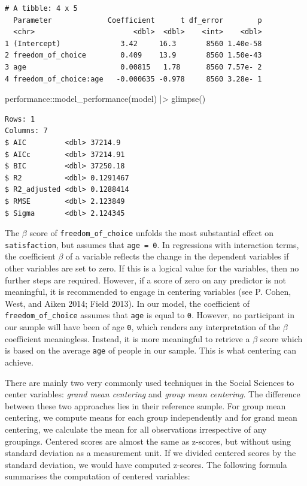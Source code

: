 \documentclass[
  letterpaper,
  DIV=11,
  numbers=noendperiod]{scrreprt}
\newenvironment{Shaded}{\begin{snugshade}}{\end{snugshade}}
\newcommand{\FunctionTok}[1]{\textcolor[rgb]{0.28,0.35,0.67}{#1}}
\newcommand{\NormalTok}[1]{\textcolor[rgb]{0.00,0.23,0.31}{#1}}
\newcommand{\SpecialCharTok}[1]{\textcolor[rgb]{0.37,0.37,0.37}{#1}}
\begin{document}
\begin{verbatim}
# A tibble: 4 x 5
  Parameter             Coefficient      t df_error        p
  <chr>                       <dbl>  <dbl>    <int>    <dbl>
1 (Intercept)              3.42     16.3       8560 1.40e-58
2 freedom_of_choice        0.409    13.9       8560 1.50e-43
3 age                      0.00815   1.78      8560 7.57e- 2
4 freedom_of_choice:age   -0.000635 -0.978     8560 3.28e- 1
\end{verbatim}

\begin{Shaded}
\begin{Highlighting}[]
\NormalTok{performance}\SpecialCharTok{::}\FunctionTok{model\_performance}\NormalTok{(model) }\SpecialCharTok{|\textgreater{}}
  \FunctionTok{glimpse}\NormalTok{()}
\end{Highlighting}
\end{Shaded}

\begin{verbatim}
Rows: 1
Columns: 7
$ AIC         <dbl> 37214.9
$ AICc        <dbl> 37214.91
$ BIC         <dbl> 37250.18
$ R2          <dbl> 0.1291467
$ R2_adjusted <dbl> 0.1288414
$ RMSE        <dbl> 2.123849
$ Sigma       <dbl> 2.124345
\end{verbatim}

The \(\beta\) score of \texttt{freedom\_of\_choice} unfolds the most
substantial effect on \texttt{satisfaction}, but assumes that
\texttt{age\ =\ 0}. In regressions with interaction terms, the
coefficient \(\beta\) of a variable reflects the change in the dependent
variables if other variables are set to zero. If this is a logical value
for the variables, then no further steps are required. However, if a
score of zero on any predictor is not meaningful, it is recommended to
engage in centering variables (see P. Cohen, West, and Aiken 2014; Field
2013). In our model, the coefficient of \texttt{freedom\_of\_choice}
assumes that \texttt{age} is equal to \texttt{0}. However, no
participant in our sample will have been of age \texttt{0}, which
renders any interpretation of the \(\beta\) coefficient meaningless.
Instead, it is more meaningful to retrieve a \(\beta\) score which is
based on the average \texttt{age} of people in our sample. This is what
centering can achieve.

There are mainly two very commonly used techniques in the Social
Sciences to center variables: \emph{grand mean centering} and
\emph{group mean centering}. The difference between these two approaches
lies in their reference sample. For group mean centering, we compute
means for each group independently and for grand mean centering, we
calculate the mean for all observations irrespective of any groupings.
Centered scores are almost the same as z-scores, but without using
standard deviation as a measurement unit. If we divided centered scores
by the standard deviation, we would have computed z-scores. The
following formula summarises the computation of centered variables:
\end{document}
